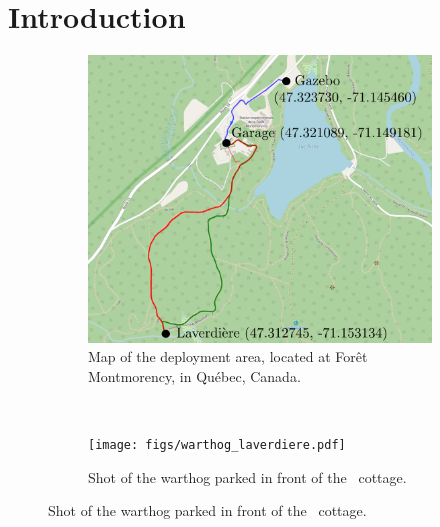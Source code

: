 \section{Introduction}
\label{sec:intro}

\lightlipsum[1]

\begin{figure} [h]
	\begin{center}
	\begin{subfigure} [b] {0.4\textwidth}
		\includegraphics[width=\linewidth]{figs/fm_paths.pdf}
		\caption{Map of the deployment area, located at For\^{e}t Montmorency, in Québec, Canada.}
		\label{fig:front_fig}
	\end{subfigure}
	~~
	\begin{subfigure} [b] {0.45\textwidth}
		\texttt{[image: figs/warthog\_laverdiere.pdf]}
		\caption{Shot of the warthog parked in front of the \laverdiere~cottage.}
		\label{fig:front_fig}
	\end{subfigure}
	\end{center}
\end{figure}

\lightlipsum[1]
\lightlipsum[1]
\lightlipsum[1]